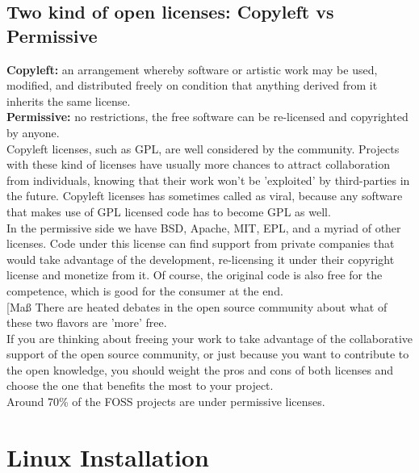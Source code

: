 \documentclass[a4paper]{article}
\begin{document}
\subsection{Two kind of open licenses: Copyleft vs Permissive}

\textbf{Copyleft:} an arrangement whereby software or artistic work may be used, modified, and distributed freely on condition that anything derived from it inherits the same license.\\
\textbf{Permissive:} no restrictions, the free software can be re-licensed and copyrighted by anyone.\\

Copyleft licenses, such as GPL, are well considered by the community. Projects with these kind of licenses have usually more chances to attract collaboration from individuals, knowing that their work won't be 'exploited' by third-parties in the future. Copyleft licenses has sometimes called as viral, because any software that makes use of GPL licensed code has to become GPL as well.\\

In the permissive side we have BSD, Apache, MIT, EPL, and a myriad of other licenses. Code under this license can find support from private companies that would take advantage of the development, re-licensing it under their copyright license and monetize from it. Of course, the original code is also free for the competence, which is good for the consumer at the end.\\
[Maß
There are heated debates in the open source community about what of these two flavors are 'more' free.\\
If you are thinking about freeing your work to take advantage of the collaborative support of the open source community, or just because you want to contribute to the open knowledge, you should weight the pros and cons of both licenses and choose the one that benefits the most to your project.\\
Around 70\% of the FOSS projects are under permissive licenses.

\section{Linux Installation}
\end{document}
